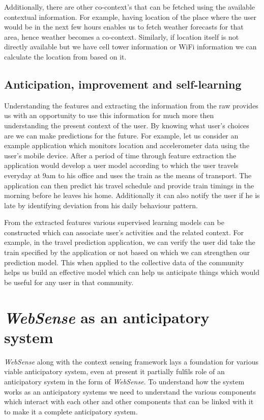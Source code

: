 \documentclass[12pt]{report}
\begin{document}
Additionally, there are other co-context's that can be fetched using the available contextual information. For example, having location of the place where the user would be in the next few hours enables us to fetch weather forecasts for that area, hence weather becomes a co-context. Similarly, if location itself is not directly available but we have cell tower information or WiFi information we can calculate the location from based on it.

\subsection{Anticipation, improvement and self-learning}
Understanding the features and extracting the information from the raw provides us with an opportunity to use this information for much more then understanding the present context of the user. By knowing what user's choices are we can make predictions for the future. For example, let us consider an example application which monitors location and accelerometer data using the user's mobile device. After a period of time through feature extraction the application would develop a user model according to which the user travels everyday at 9am to his office and uses the train as the means of transport. The application can then predict his travel schedule and provide train timings in the morning before he leaves his home. Additionally it can also notify the user if he is late by identifying deviation from his daily behaviour pattern.

From the extracted features various supervised learning models can be constructed which can associate user's activities and the related context. For example, in the travel prediction application, we can verify the user did take the train specified by the application or not based on which we can strengthen our prediction model. This when applied to the collective data of the community helps us build an effective model which can help us anticipate things which would be useful for any user in that community.

\section{\textit{WebSense} as an anticipatory system}

\textit{WebSense} along with the context sensing framework lays a foundation for various viable anticipatory system, even at present it partially fulfils role of an anticipatory system in the form of \textit{WebSense}. To understand how the system works as an anticipatory systems we need to understand the various components which interact with each other and other components that can be linked with it to make it a complete anticipatory system.
\end{document}

